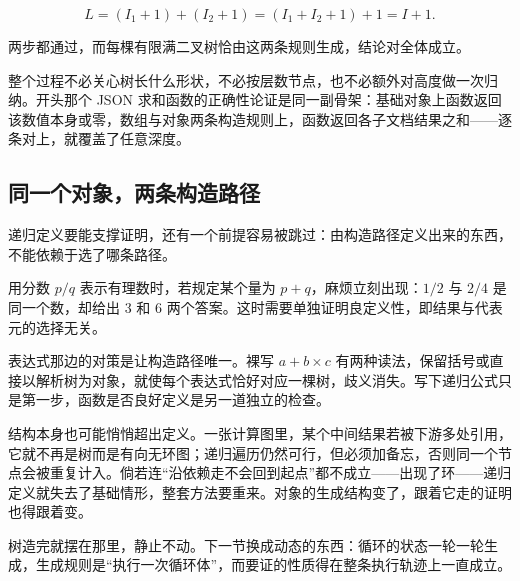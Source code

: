\[
L=(I_1+1)+(I_2+1)=(I_1+I_2+1)+1=I+1 .
\]

两步都通过，而每棵有限满二叉树恰由这两条规则生成，结论对全体成立。

整个过程不必关心树长什么形状，不必按层数节点，也不必额外对高度做一次归纳。开头那个 JSON 求和函数的正确性论证是同一副骨架：基础对象上函数返回该数值本身或零，数组与对象两条构造规则上，函数返回各子文档结果之和——逐条对上，就覆盖了任意深度。

\subsection{同一个对象，两条构造路径}

递归定义要能支撑证明，还有一个前提容易被跳过：由构造路径定义出来的东西，不能依赖于选了哪条路径。

用分数 \(p/q\) 表示有理数时，若规定某个量为 \(p+q\)，麻烦立刻出现：\(1/2\) 与 \(2/4\) 是同一个数，却给出 3 和 6 两个答案。这时需要单独证明良定义性，即结果与代表元的选择无关。

表达式那边的对策是让构造路径唯一。裸写 \(a+b\times c\) 有两种读法，保留括号或直接以解析树为对象，就使每个表达式恰好对应一棵树，歧义消失。写下递归公式只是第一步，函数是否良好定义是另一道独立的检查。

结构本身也可能悄悄超出定义。一张计算图里，某个中间结果若被下游多处引用，它就不再是树而是有向无环图；递归遍历仍然可行，但必须加备忘，否则同一个节点会被重复计入。倘若连``沿依赖走不会回到起点''都不成立——出现了环——递归定义就失去了基础情形，整套方法要重来。对象的生成结构变了，跟着它走的证明也得跟着变。

树造完就摆在那里，静止不动。下一节换成动态的东西：循环的状态一轮一轮生成，生成规则是``执行一次循环体''，而要证的性质得在整条执行轨迹上一直成立。
